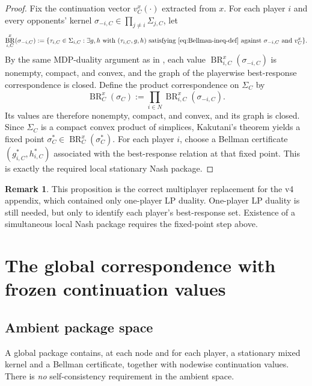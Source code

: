 \documentclass[12pt]{article}
\theoremstyle{definition}
\newtheorem{remark}[theorem]{Remark}
\newcommand{\1}{\mathbf{1}}
\DeclareMathOperator{\BR}{BR}
\begin{document}
\begin{proof}
Fix the continuation vector $v_C^x(\cdot)$ extracted from $x$. For each player
$i$ and every opponents' kernel
$\sigma_{-i,C}\in\prod_{j\ne i}\Sigma_{j,C}$, let
\[
\BR_{i,C}^x(\sigma_{-i,C})
:=
\{\tau_{i,C}\in\Sigma_{i,C}: \exists g,h\text{ with }
(\tau_{i,C},g,h)\text{ satisfying \eqref{eq:Bellman-ineq-def} against }
\sigma_{-i,C}\text{ and }v_C^x\}.
\]
By the same MDP-duality argument as in , each value
$\BR_{i,C}^x(\sigma_{-i,C})$ is nonempty, compact, and convex, and the graph of
the playerwise best-response correspondence is closed. Define the product
correspondence on $\Sigma_C$ by
\[
\BR_C^x(\sigma_C):=\prod_{i\in N}\BR_{i,C}^x(\sigma_{-i,C}).
\]
Its values are therefore nonempty, compact, and convex, and its graph is closed.
Since $\Sigma_C$ is a compact convex product of simplices, Kakutani's theorem
\cite{Kakutani1941} yields a fixed point $\sigma_C^*\in\BR_C^x(\sigma_C^*)$. For
each player $i$, choose a Bellman certificate $(g_{i,C}^*,h_{i,C}^*)$ associated
with the best-response relation at that fixed point. This is exactly the required
local stationary Nash package.
\end{proof}

\begin{remark}
This proposition is the correct multiplayer replacement for the v4 appendix, which
contained only one-player LP duality. One-player LP duality is still needed, but
only to identify each player's best-response set. Existence of a simultaneous
local Nash package requires the fixed-point step above.
\end{remark}

\section{The global correspondence with frozen continuation values}
\label{sec:global}

\subsection{Ambient package space}

A global package contains, at each node and for each player, a stationary mixed
kernel and a Bellman certificate, together with nodewise continuation values.
There is \emph{no} self-consistency requirement in the ambient space.
\end{document}
